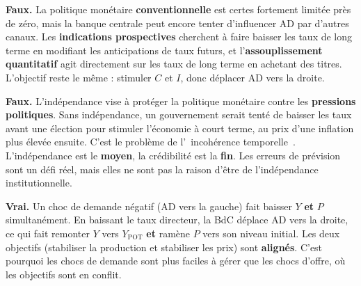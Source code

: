 
\begin{reponse}
\textbf{Faux.} La politique monétaire \textbf{conventionnelle} est certes fortement limitée près de zéro, mais la banque centrale peut encore tenter d'influencer AD par d'autres canaux. Les \textbf{indications prospectives} cherchent à faire baisser les taux de long terme en modifiant les anticipations de taux futurs, et l'\textbf{assouplissement quantitatif} agit directement sur les taux de long terme en achetant des titres. L'objectif reste le même : stimuler $C$ et $I$, donc déplacer AD vers la droite.
\end{reponse}


\begin{reponse}
\textbf{Faux.} L'indépendance vise à protéger la politique monétaire contre les \textbf{pressions politiques}. Sans indépendance, un gouvernement serait tenté de baisser les taux avant une élection pour stimuler l'économie à court terme, au prix d'une inflation plus élevée ensuite. C'est le problème de l'\guillemotleft~incohérence temporelle~\guillemotright. L'indépendance est le \textbf{moyen}, la crédibilité est la \textbf{fin}. Les erreurs de prévision sont un défi réel, mais elles ne sont pas la raison d'être de l'indépendance institutionnelle.
\end{reponse}



\begin{reponse}
\textbf{Vrai.} Un choc de demande négatif (AD vers la gauche) fait baisser $Y$ \textbf{et} $P$ simultanément. En baissant le taux directeur, la BdC déplace AD vers la droite, ce qui fait remonter $Y$ vers $Y_{\text{POT}}$ \textbf{et} ramène $P$ vers son niveau initial. Les deux objectifs (stabiliser la production et stabiliser les prix) sont \textbf{alignés}. C'est pourquoi les chocs de demande sont plus faciles à gérer que les chocs d'offre, où les objectifs sont en conflit.
\end{reponse}


